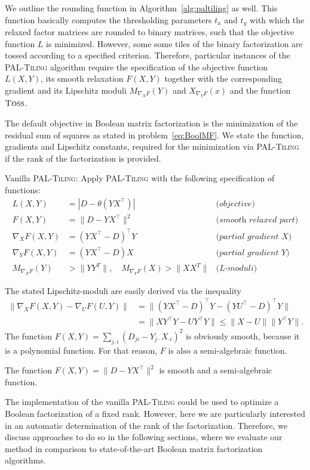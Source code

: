 We outline the rounding function in Algorithm~\ref{alg:paltiling} as well. This function basically computes the thresholding parameters $t_x$ and $t_y$ with which the relaxed factor matrices are rounded to binary matrices, such that the objective function $L$ is minimized. However, some some tiles of the binary factorization are tossed according to a specified criterion. Therefore, particular instances of the \textsc{PAL-Tiling} algorithm require the specification of the objective function $L(X,Y)$, its smooth relaxation $F(X,Y)$ together with the corresponding gradient and its Lipschitz moduli $M_{\nabla_XF}(Y)$ and $X_{\nabla_YF}(x)$ and the function $\textsc{Toss}$.

The default objective in Boolean matrix factorization is the minimization of the residual sum of squares as stated in problem~\ref{eq:BoolMF}. We state the function, gradients and Lipschitz constants, required for the minimization via \textsc{PAL-Tiling} if the rank of the factorization is provided.
\begin{mybox}
\begin{algSpec}\label{algSpec:BMF}
Vanilla \textsc{PAL-Tiling}: Apply \textsc{PAL-Tiling} with the following specification of functions:
\begin{align*}
    L(X,Y) &= |D-\theta(YX^\top)| & \textit{(objective)}\\
    F(X,Y)&=\|D-YX^\top\|^2 &\textit{(smooth relaxed part)}\\
    \nabla_XF(X,Y) &= (YX^\top-D)^\top Y &\textit{(partial gradient $X$)}\\
    \nabla_YF(X,Y) &= (YX^\top-D) X &\textit{(partial gradient $Y$)}\\
    M_{\nabla_XF}(Y)&>\|YY^T\|, \quad M_{\nabla_YF}(X)>\|XX^T\| &\textit{(L-moduli)} 
\end{align*}
\end{algSpec}
\end{mybox}
The stated Lipschitz-moduli are easily derived via the inequality
\begin{align*}
    \|\nabla_XF(X,Y) - \nabla_UF(U,Y)\| &= \|(YX^\top-D)^\top Y - (YU^\top-D)^\top Y\|\\
    &= \|XY^\top Y - UY^\top Y\| \leq \|X-U\|\|Y^\top Y\|.
\end{align*}
The function $F(X,Y)=\sum_{j,i}(D_{ji}-Y_{ j\cdot}X_{\cdot i})^2$ is obviously smooth, because it is a polynomial function. For that reason, $F$ is also a semi-algebraic function.
\begin{corollary}
The function $F(X,Y)=\|D-YX^\top\|^2$ is smooth and a semi-algebraic function.
\end{corollary}
The implementation of the vanilla \textsc{PAL-Tiling} could be used to optimize a Boolean factorization of a fixed rank. However, here we are particularly interested in an automatic determination of the rank of the factorization. Therefore, we discuss approaches to do so in the following sections, where we evaluate our method in comparison to state-of-the-art Boolean matrix factorization algorithms. 
